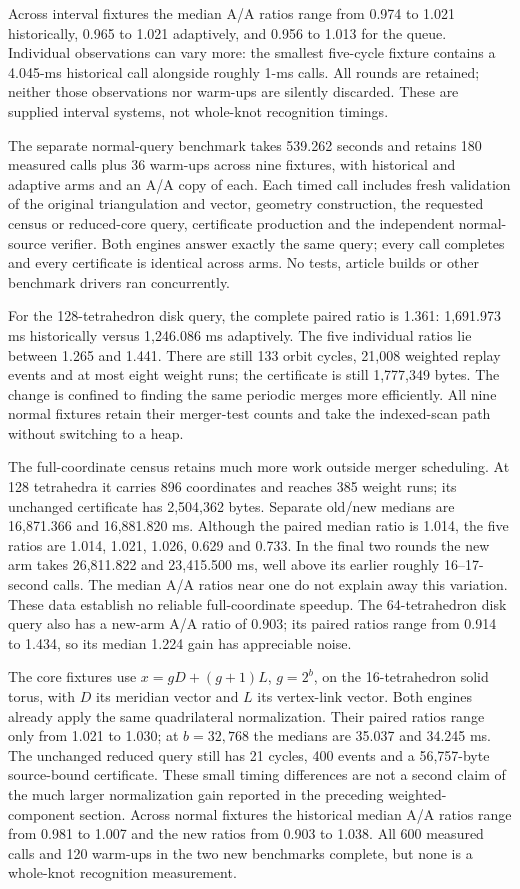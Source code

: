 Across interval fixtures the median A/A ratios range from 0.974 to 1.021
historically, 0.965 to 1.021 adaptively, and 0.956 to 1.013 for the queue.
Individual observations can vary more: the smallest five-cycle fixture
contains a 4.045-ms historical call alongside roughly 1-ms calls. All rounds
are retained; neither those observations nor warm-ups are silently discarded.
These are supplied interval systems, not whole-knot recognition timings.

The separate normal-query benchmark takes 539.262 seconds and retains
180 measured calls plus 36 warm-ups across nine fixtures, with historical
and adaptive arms and an A/A copy of each. Each timed call includes fresh
validation of the original triangulation and vector, geometry construction,
the requested census or reduced-core query, certificate production and the
independent normal-source verifier. Both engines answer exactly the same
query; every call completes and every certificate is identical across arms.
No tests, article builds or other benchmark drivers ran concurrently.



For the 128-tetrahedron disk query, the complete paired ratio is 1.361:
1,691.973 ms historically versus 1,246.086 ms adaptively. The five individual
ratios lie between 1.265 and 1.441. There are still 133 orbit cycles,
21,008 weighted replay events and at most eight weight runs; the certificate
is still 1,777,349 bytes. The change is confined to finding the same periodic
merges more efficiently. All nine normal fixtures retain their merger-test
counts and take the indexed-scan path without switching to a heap.

The full-coordinate census retains much more work outside merger scheduling.
At 128 tetrahedra it carries 896 coordinates and reaches 385 weight runs;
its unchanged certificate has 2,504,362 bytes. Separate old/new medians are
16,871.366 and 16,881.820 ms. Although the paired median ratio is 1.014,
the five ratios are 1.014, 1.021, 1.026, 0.629 and 0.733. In the final two
rounds the new arm takes 26,811.822 and 23,415.500 ms, well above its earlier
roughly 16--17-second calls. The median A/A ratios near one do not explain
away this variation. These data establish no reliable full-coordinate
speedup. The 64-tetrahedron disk query also has a new-arm A/A ratio of 0.903;
its paired ratios range from 0.914 to 1.434, so its median 1.224 gain has
appreciable noise.

The core fixtures use $x=gD+(g+1)L$, $g=2^b$, on the 16-tetrahedron solid
torus, with $D$ its meridian vector and $L$ its vertex-link vector. Both
engines already apply the same quadrilateral normalization. Their paired
ratios range only from 1.021 to 1.030; at $b=32,768$ the medians are 35.037
and 34.245 ms. The unchanged reduced query still has 21 cycles, 400 events
and a 56,757-byte source-bound certificate. These small timing differences
are not a second claim of the much larger normalization gain reported in
the preceding weighted-component section. Across normal fixtures the
historical median A/A ratios range from 0.981 to 1.007 and the new ratios
from 0.903 to 1.038. All 600 measured calls and 120 warm-ups in the two
new benchmarks complete, but none is a whole-knot recognition measurement.
